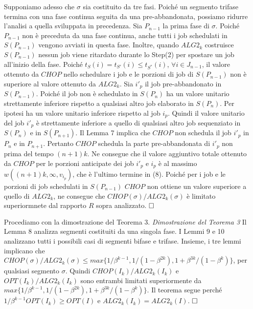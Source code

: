 \documentclass[12pt]{article}
\begin{document}
Supponiamo adesso che $\sigma$ sia costituito da tre fasi. Poiché un segmento trifase termina con una fase continua seguita da una pre-abbandonata, possiamo ridurre l'analisi a quella sviluppata in precedenza. Sia $P_{n - 1}$ la prima fase di $\sigma$. Poiché $P_{n - 1}$ non è preceduta da una fase continua, anche tutti i job schedulati in $S (P_{n - 1})$ vengono avviati in questa fase. Inoltre, quando $ALG2_{k}$ costruisce $S (P_{n - 1})$ nessun job viene ritardato durante lo Step(2) per spostare un job all'inizio della fase. Poiché $t_{S}(i) = t_{S'} (i) \leq t_{S^{*}} (i)$, $\forall i \in J_{n-1}$, il valore ottenuto da $CHOP$ nello schedulare i job e le porzioni di job di $S(P_{n - 1})$ non è superiore al valore ottenuto da $ALG2_{k}$. Sia $i'_{p}$ il job pre-abbandonato in $S (P_{n - 1})$. Poiché il job non è schedulato in $S(P_{n})$ ha un valore unitario strettamente inferiore rispetto a qualsiasi altro job elaborato in $S (P_{n})$. Per ipotesi ha un valore unitario inferiore rispetto al job $i_{p}$. Quindi il valore unitario del job $i'_{p}$ è strettamente inferiore a quello di qualsiasi altro job sequenziato in $S (P_{n})$ e in $S(P_{n + 1})$. Il Lemma 7 implica che $CHOP$ non schedula il job $i'_{p}$ in $P_{n}$ e in $P_{n + 1}$. Pertanto $CHOP$ schedula la parte pre-abbandonata di $i'_{p}$ non prima del tempo $(n + 1) k$. Ne consegue che il valore aggiuntivo totale ottenuto da $CHOP$ per le porzioni anticipate dei job $i'_{p}$ e $i_{p}$ è al massimo $w ((n + 1) k, \infty, v_{i_{p}})$, che è l'ultimo termine in (8). Poiché per i job e le porzioni di job schedulati in $S (P_{n - 1})$ $CHOP$ non ottiene un valore superiore a quello di $ALG2_{k}$, ne consegue che $CHOP (\sigma) / ALG2_{k} (\sigma)$ è limitato superiormnete dal rapporto $R$ sopra analizzato. $\hfill \square$

Procediamo con la dimostrazione del Teorema 3.
\newline \newline
\textit{Dimostrazione del Teorema 3} Il Lemma 8 analizza segmenti costituiti da una singola fase.
I Lemmi 9 e 10 analizzano tutti i possibili casi di segmenti bifase e trifase.
Insieme, i tre lemmi implicano che $CHOP (\sigma) / ALG2_{k} (\sigma) \leq max \{1 / \beta^{k-1}, 1 / (1 -\beta^{2k}), 1 + \beta^{3k} / (1 - \beta^{k} )\}$, per qualsiasi segmento $\sigma$. Quindi $CHOP (I_{k}) / ALG2_{k} (I_{k})$ e $OPT (I_{k}) / ALG2_{k} (I_{k})$ sono entrambi limitati superiormente da $max \{1 / \beta^{k-1}, 1 / (1 - \beta^{2k}), 1 + \beta^{3k} / (1 - \beta^{k})\}$. Il teorema segue perché $1 / \beta^{k-1}OPT(I_{k}) \geq OPT(I)$ e $ALG2_{k} (I_{k}) = ALG2_{k} (I)$. $\hfill \square$
\end{document}
